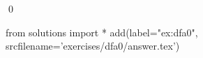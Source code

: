 
\begin{ex} 
  \label{ex:dfa0}
  
  \qed
\end{ex} 
\begin{python0}
from solutions import *
add(label="ex:dfa0",
    srcfilename='exercises/dfa0/answer.tex') 
\end{python0}
